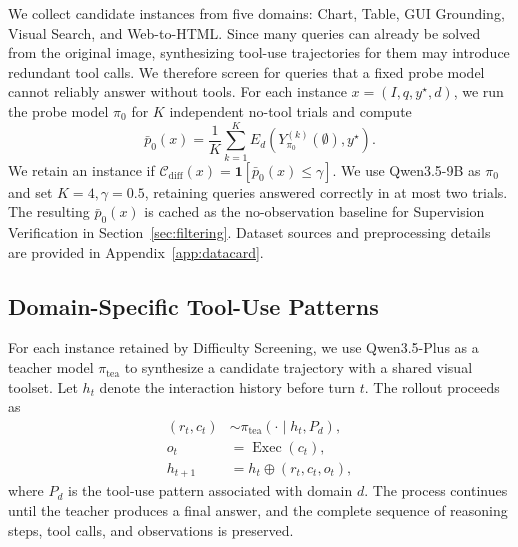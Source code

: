 We collect candidate instances from five domains: Chart, Table, GUI Grounding, Visual Search, and Web-to-HTML. 
Since many queries can already be solved from the original image, synthesizing tool-use trajectories for them may introduce redundant tool calls. 
We therefore screen for queries that a fixed probe model cannot reliably answer without tools.
For each instance $x=(I,q,y^\star,d)$, we run the probe model $\pi_0$ for $K$ independent no-tool trials and compute
\begin{equation}
\bar{p}_0(x)=\frac{1}{K}\sum_{k=1}^{K}E_d\left(Y_{\pi_0}^{(k)}(\emptyset),y^\star\right).
\label{eq:no-tool-success-rate}
\end{equation}
We retain an instance if $\mathcal{C}_{\mathrm{diff}}(x)=\mathbf{1}\left[\bar{p}_0(x)\leq\gamma\right]$.
We use Qwen3.5-9B as $\pi_0$ and set $K\!=\!4, \gamma\!=\!0.5$, retaining queries answered correctly in at most two trials. 
The resulting $\bar{p}_0(x)$ is cached as the no-observation baseline for Supervision Verification in Section~\ref{sec:filtering}. 
Dataset sources and preprocessing details are provided in Appendix~\ref{app:datacard}.


\subsection{Domain-Specific Tool-Use Patterns}
\label{sec:synthesis}


For each instance retained by Difficulty Screening, we use Qwen3.5-Plus as a teacher model $\pi_{\text{tea}}$ to synthesize a candidate trajectory with a shared visual toolset. 
Let $h_t$ denote the interaction history before turn $t$. 
The rollout proceeds as
\begin{equation}
\begin{aligned}
(r_t,c_t)
&\sim \pi_{\mathrm{tea}}(\cdot\mid h_t,P_d), \\
o_t
&=\operatorname{Exec}(c_t), \\
h_{t+1}
&=h_t\oplus(r_t,c_t,o_t),
\end{aligned}
\label{eq:teacher-rollout}
\end{equation}
where $P_d$ is the tool-use pattern associated with domain $d$. 
The process continues until the teacher produces a final answer, and the complete sequence of reasoning steps, tool calls, and observations is preserved.

